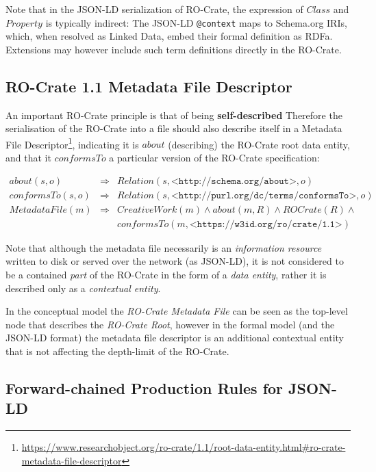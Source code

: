 Note that in the JSON-LD serialization of RO-Crate, the expression of $Class$ and $Property$ is typically indirect: The JSON-LD \texttt{@context} maps to Schema.org IRIs, which, when resolved as Linked Data, embed their formal definition as RDFa. Extensions may however include such term definitions directly in the RO-Crate.

\subsection{RO-Crate 1.1 Metadata File Descriptor}

An important RO-Crate principle is that of being \textbf{self-described} Therefore the serialisation of the RO-Crate into a file should also describe itself in a Metadata File Descriptor\footnote{
    \url{https://www.researchobject.org/ro-crate/1.1/root-data-entity.html\#ro-crate-metadata-file-descriptor}
}, indicating it is $about$ (describing) the RO-Crate root data entity, and that it $conformsTo$ a particular version of the RO-Crate specification:

\begin{eqnarray*}
about(s,o)      & \Rightarrow & Relation(s, \texttt{<http://schema.org/about>}, o)   \\
conformsTo(s,o) & \Rightarrow & Relation(s, \texttt{<http://purl.org/dc/terms/conformsTo>}, o)   \\
MetadataFile(m) & \Rightarrow & CreativeWork(m) \land about(m,R) ∧ ROCrate(R) \land    \\
                &             & conformsTo(m, \texttt{<https://w3id.org/ro/crate/1.1>})
\end{eqnarray*}

Note that although the metadata file necessarily is an \emph{information resource} written to disk or served over the network (as JSON-LD), it is not considered to be a contained \emph{part} of the RO-Crate in the form of a \emph{data entity}, rather it is described only as a \emph{contextual entity}.

In the conceptual model the \emph{RO-Crate Metadata File} can be seen as the top-level node that describes the \emph{RO-Crate Root}, however in the formal model (and the JSON-LD format) the metadata file descriptor is an additional contextual entity that is not affecting the depth-limit of the RO-Crate.

\subsection{Forward-chained Production Rules for JSON-LD}

